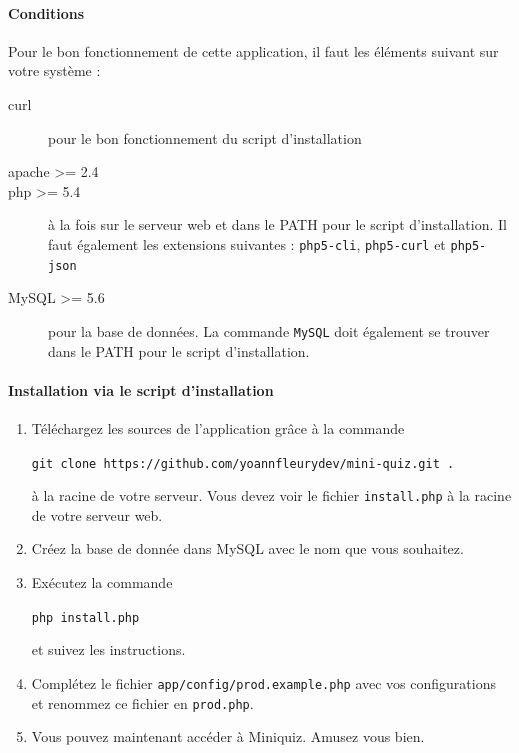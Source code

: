 \documentclass[12pt]{article}
\begin{document}
    \paragraph{Conditions} Pour le bon fonctionnement de cette application, il faut les éléments suivant sur votre système :
    \begin{description}
        \item[curl] pour le bon fonctionnement du script d'installation
        \item[apache >= 2.4]
        \item[php >= 5.4] à la fois sur le serveur web et dans le PATH pour le script d'installation. Il faut également les extensions suivantes : \texttt{php5-cli}, \texttt{php5-curl} et \texttt{php5-json}
        \item[MySQL >= 5.6] pour la base de données. La commande \texttt{MySQL} doit également se trouver dans le PATH pour le script d'installation.
    \end{description}
    
    \paragraph{Installation via le script d'installation}
    \begin{enumerate}
        \item Téléchargez les sources de l'application grâce à la commande
        \begin{center}
            \texttt{git  clone https://github.com/yoannfleurydev/mini-quiz.git .}\\
        \end{center} 
        à la racine de votre serveur. Vous devez voir le fichier \texttt{install.php} à la racine de votre serveur web.
        \item Créez la base de donnée dans MySQL avec le nom que vous souhaitez. 
        \item Exécutez la commande  
        \begin{center}
            \texttt{php install.php}\\
        \end{center}
        et suivez les instructions.
        \item Complétez le fichier \texttt{app/config/prod.example.php} avec vos configurations et renommez ce fichier en \texttt{prod.php}.
        \item Vous pouvez maintenant accéder à Miniquiz. Amusez vous bien.
    \end{enumerate}
    
\end{document}
